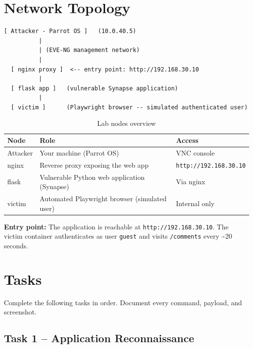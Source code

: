 \documentclass[a4paper, 12pt]{article}
\begin{document}
\section{Network Topology}

\begin{verbatim}
[ Attacker - Parrot OS ]   (10.0.40.5)
          |
          | (EVE-NG management network)
          |
  [ nginx proxy ]  <-- entry point: http://192.168.30.10
          |
  [ flask app ]   (vulnerable Synapse application)
          |
  [ victim ]      (Playwright browser -- simulated authenticated user)
\end{verbatim}

\begin{table}[H]
\centering
\begin{tabularx}{0.9\textwidth}{lXl}
\toprule
\textbf{Node}   & \textbf{Role}                                    & \textbf{Access} \\
\midrule
Attacker        & Your machine (Parrot OS)                         & VNC console \\
nginx           & Reverse proxy exposing the web app               & \texttt{http://192.168.30.10} \\
flask           & Vulnerable Python web application (Synapse)      & Via nginx \\
victim          & Automated Playwright browser (simulated user)    & Internal only \\
\bottomrule
\end{tabularx}
\caption{Lab nodes overview}
\end{table}

\textbf{Entry point:} The application is reachable at \texttt{http://192.168.30.10}.
The victim container authenticates as user \texttt{guest} and visits
\texttt{/comments} every \textasciitilde{}20 seconds.

\section{Tasks}

Complete the following tasks in order. Document every command, payload, and
screenshot.

\subsection{Task 1 -- Application Reconnaissance}
\end{document}
